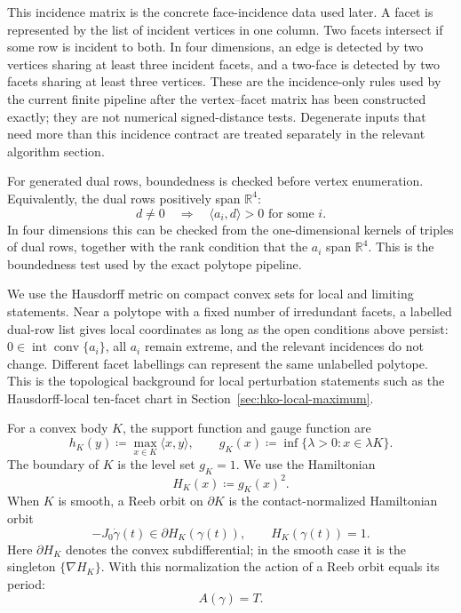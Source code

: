 This incidence matrix is the concrete face-incidence data used later. A facet
is represented by the list of incident vertices in one column. Two facets
intersect if some row is incident to both. In four dimensions, an edge is
detected by two vertices sharing at least three incident facets, and a
two-face is detected by two facets sharing at least three vertices. These
are the incidence-only rules used by the current finite pipeline after the
vertex--facet matrix has been constructed exactly; they are not numerical
signed-distance tests. Degenerate inputs that need more than this incidence
contract are treated separately in the relevant algorithm section.

For generated dual rows, boundedness is checked before vertex enumeration.
Equivalently, the dual rows positively span \(\mathbb{R}^4\):
\[
  d\neq0
  \quad\Longrightarrow\quad
  \langle a_i,d\rangle>0
  \text{ for some }i.
\]
In four dimensions this can be checked from the one-dimensional kernels of
triples of dual rows, together with the rank condition that the \(a_i\) span
\(\mathbb{R}^4\). This is the boundedness test used by the exact polytope
pipeline.

We use the Hausdorff metric on compact convex sets for local and limiting
statements. Near a polytope with a fixed number of irredundant facets, a
labelled dual-row list gives local coordinates as long as the open conditions
above persist: \(0\in\operatorname{int}\operatorname{conv}\{a_i\}\), all
\(a_i\) remain extreme, and the relevant incidences do not change. Different
facet labellings can represent the same unlabelled polytope. This is the
topological background for local perturbation statements such as the
Hausdorff-local ten-facet chart in
Section~\ref{sec:hko-local-maximum}.

For a convex body \(K\), the support function and gauge function are
\[
  h_K(y) \coloneqq \max_{x\in K}\langle x,y\rangle,
  \qquad
  g_K(x) \coloneqq \inf\{\lambda>0:x\in \lambda K\}.
\]
The boundary of \(K\) is the level set \(g_K=1\). We use the Hamiltonian
\[
  H_K(x) \coloneqq g_K(x)^2.
\]
When \(K\) is smooth, a Reeb orbit on \(\partial K\) is the contact-normalized
Hamiltonian orbit
\begin{equation}\label{eq:preliminaries-smooth-reeb-inclusion}
  -J_0\dot{\gamma}(t) \in \partial H_K(\gamma(t)),
  \qquad
  H_K(\gamma(t))=1.
\end{equation}
Here \(\partial H_K\) denotes the convex subdifferential; in the smooth case it
is the singleton \(\{\nabla H_K\}\). With this normalization the action of a
Reeb orbit equals its period:
\[
  A(\gamma)=T.
\]

